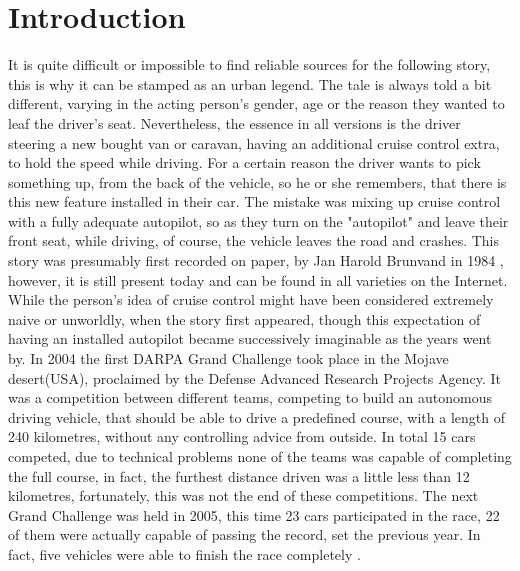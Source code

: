 
\chapter{Introduction}\label{chapter:introduction}

It is quite difficult or impossible to find reliable sources for the following story, this is why it can be stamped as an urban legend. The tale is always told a bit different, varying in the acting person's gender, age or the reason they wanted to leaf the driver's seat. Nevertheless, the essence in all versions is the driver steering a new bought van or caravan, having an additional cruise control extra, to hold the speed while driving. For a certain reason the driver wants to pick something up, from the back of the vehicle, so he or she remembers, that there is this new feature installed in their car. The mistake was mixing up cruise control with a fully adequate autopilot, so as they turn on the "autopilot" and leave their front seat, while driving, of course, the vehicle leaves the road and crashes. \newline
This story was presumably first recorded on paper, by Jan Harold Brunvand in 1984 \cite{brunvand}, however, it is still present today and can be found in all varieties on the Internet. While the person's idea of cruise control might have been considered extremely naive or unworldly, when the story first appeared, though this expectation of having an installed autopilot became successively imaginable as the years went by. \newline
In 2004 the first DARPA Grand Challenge took place \cite{darpa2004} in the Mojave desert(USA), proclaimed by the Defense Advanced Research Projects Agency. It was a competition between different teams, competing to build an autonomous driving vehicle, that should be able to drive a predefined course, with a length of 240 kilometres, without any controlling advice from outside. In total 15 cars competed, due to technical problems none of the teams was capable of completing the full course, in fact, the furthest distance driven was a little less than 12 kilometres, fortunately, this was not the end of these competitions. \newline
The next Grand Challenge was held in 2005, this time 23 cars participated in the race, 22 of them were actually capable of passing the record, set the previous year. In fact, five vehicles were able to finish the race completely \cite{darpa2005}.\newline
